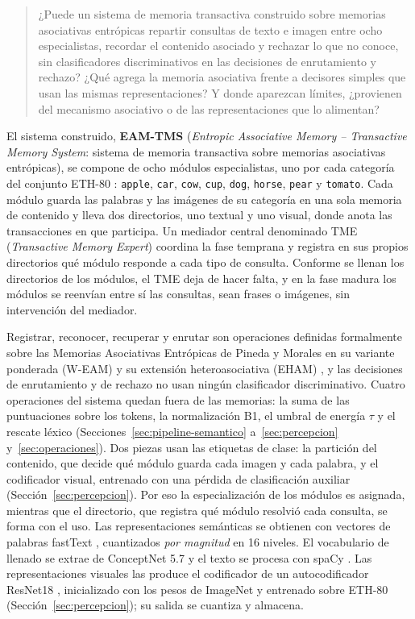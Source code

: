 \begin{quote}
¿Puede un sistema de memoria transactiva construido sobre memorias asociativas
entrópicas repartir consultas de texto e imagen entre ocho especialistas, recordar el
contenido asociado y rechazar lo que no conoce, sin clasificadores discriminativos en
las decisiones de enrutamiento y rechazo? ¿Qué agrega la memoria asociativa frente a
decisores simples que usan las mismas representaciones? Y donde aparezcan límites,
¿provienen del mecanismo asociativo o de las representaciones que lo alimentan?
\end{quote}

El sistema construido, \textbf{EAM-TMS} (\textit{Entropic Associative Memory --
Transactive Memory System}: sistema de memoria transactiva sobre memorias asociativas
entrópicas), se compone de ocho módulos especialistas, uno por cada categoría del
conjunto ETH-80 \cite{leibe2003eth80}: \texttt{apple}, \texttt{car}, \texttt{cow},
\texttt{cup}, \texttt{dog}, \texttt{horse}, \texttt{pear} y \texttt{tomato}.
Cada módulo guarda las palabras y las imágenes de su categoría en una sola memoria de
contenido y lleva dos directorios, uno textual y uno visual, donde anota las
transacciones en que participa.
Un mediador central denominado TME (\textit{Transactive Memory Expert}) coordina la fase
temprana y registra en sus propios directorios qué módulo responde a cada tipo de
consulta.
Conforme se llenan los directorios de los módulos, el TME deja de hacer falta, y en la
fase madura los módulos se reenvían entre sí las consultas, sean frases o imágenes, sin
intervención del mediador.

Registrar, reconocer, recuperar y enrutar son operaciones definidas formalmente sobre
las Memorias Asociativas Entrópicas de Pineda y Morales en su variante ponderada
(W-EAM) \cite{pineda2021entropic,pineda2022weighted} y su extensión heteroasociativa
(EHAM) \cite{morales2025missing}, y las decisiones de enrutamiento y de rechazo no usan
ningún clasificador discriminativo.
Cuatro operaciones del sistema quedan fuera de las memorias: la suma de las
puntuaciones sobre los tokens, la normalización B1, el umbral de energía $\tau$ y el
rescate léxico (Secciones~\ref{sec:pipeline-semantico} a~\ref{sec:percepcion}
y~\ref{sec:operaciones}).
Dos piezas usan las etiquetas de clase: la partición del contenido, que decide qué
módulo guarda cada imagen y cada palabra, y el codificador visual, entrenado con una
pérdida de clasificación auxiliar (Sección~\ref{sec:percepcion}).
Por eso la especialización de los módulos es asignada, mientras que el directorio, que
registra qué módulo resolvió cada consulta, se forma con el uso.
Las representaciones semánticas se obtienen con vectores de palabras fastText
\cite{bojanowski2017fasttext}, cuantizados \emph{por magnitud} en 16 niveles.
El vocabulario de llenado se extrae de ConceptNet 5.7 \cite{speer2017conceptnet}
y el texto se procesa con spaCy \cite{honnibal2020spacy}.
Las representaciones visuales las produce el codificador de un autocodificador ResNet18
\cite{he2016resnet}, inicializado con los pesos de ImageNet y entrenado sobre ETH-80
(Sección~\ref{sec:percepcion}); su salida se cuantiza y almacena.

